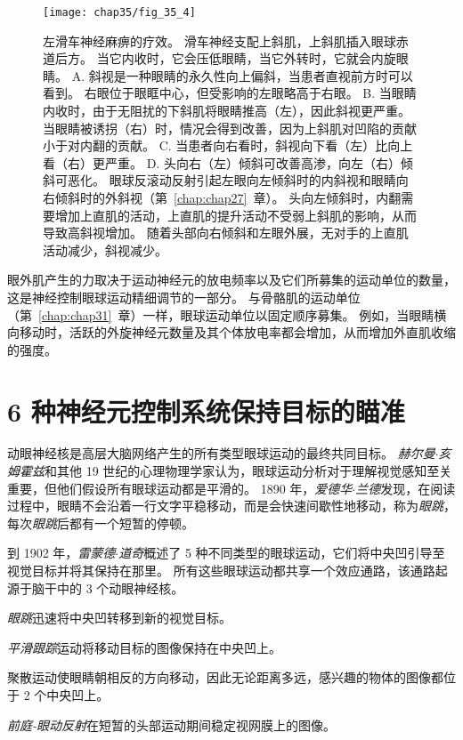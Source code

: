 \begin{figure}[htbp]
	\centering
	\texttt{[image: chap35/fig\_35\_4]}
	\caption{左滑车神经麻痹的疗效。
		滑车神经支配上斜肌，上斜肌插入眼球赤道后方。
		当它内收时，它会压低眼睛，当它外转时，它就会内旋眼睛。
		A. 斜视是一种眼睛的永久性向上偏斜，当患者直视前方时可以看到。
		右眼位于眼眶中心，但受影响的左眼略高于右眼。
		B. 当眼睛内收时，由于无阻扰的下斜肌将眼睛推高（左），因此斜视更严重。
		当眼睛被诱拐（右）时，情况会得到改善，因为上斜肌对凹陷的贡献小于对内翻的贡献。
		C. 当患者向右看时，斜视向下看（左）比向上看（右）更严重。
		D. 头向右（左）倾斜可改善高渗，向左（右）倾斜可恶化。
		眼球反滚动反射引起左眼向左倾斜时的内斜视和眼睛向右倾斜时的外斜视（第~\ref{chap:chap27}~章）。
		头向左倾斜时，内翻需要增加上直肌的活动，上直肌的提升活动不受弱上斜肌的影响，从而导致高斜视增加。
		随着头部向右倾斜和左眼外展，无对手的上直肌活动减少，斜视减少。}
	\label{fig:35_4}
\end{figure}


眼外肌产生的力取决于运动神经元的放电频率以及它们所募集的运动单位的数量，这是神经控制眼球运动精细调节的一部分。
与骨骼肌的运动单位（第~\ref{chap:chap31}~章）一样，眼球运动单位以固定顺序募集。
例如，当眼睛横向移动时，活跃的外旋神经元数量及其个体放电率都会增加，从而增加外直肌收缩的强度。



\section{6 种神经元控制系统保持目标的瞄准}

动眼神经核是高层大脑网络产生的所有类型眼球运动的最终共同目标。
\textit{赫尔曼$\cdot$亥姆霍兹}和其他 19 世纪的心理物理学家认为，眼球运动分析对于理解视觉感知至关重要，但他们假设所有眼球运动都是平滑的。
1890 年，\textit{爱德华$\cdot$兰德}发现，在阅读过程中，眼睛不会沿着一行文字平稳移动，而是会快速间歇性地移动，称为\textit{眼跳}，每次\textit{眼跳}后都有一个短暂的停顿。


到 1902 年，\textit{雷蒙德$\cdot$道奇}概述了 5 种不同类型的眼球运动，它们将中央凹引导至视觉目标并将其保持在那里。
所有这些眼球运动都共享一个效应通路，该通路起源于脑干中的 3 个动眼神经核。


\textit{眼跳}迅速将中央凹转移到新的视觉目标。


\textit{平滑跟踪}运动将移动目标的图像保持在中央凹上。


聚散运动使眼睛朝相反的方向移动，因此无论距离多远，感兴趣的物体的图像都位于 2 个中央凹上。


\textit{前庭-眼动反射}在短暂的头部运动期间稳定视网膜上的图像。


